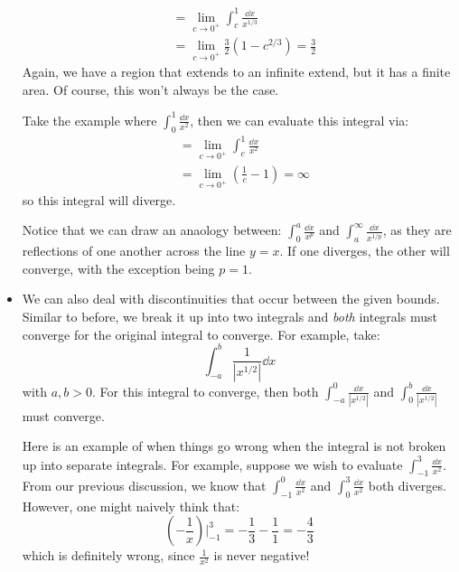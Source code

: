 \begin{itemize}
\begin{example}
        \begin{align}
            &= \lim_{c\to 0^+} \int_c^1 \frac{\dd{x}}{x^{1/3}} \\ 
            &= \lim_{c\to 0^+} \frac{3}{2}\left(1-c^{2/3}\right) = \frac{3}{2}
        \end{align}
        Again, we have a region that extends to an infinite extend, but it has a finite area. Of course, this won't always be the case.
    \end{example}
    \begin{example}
        Take the example where $\int_0^1 \frac{\dd{x}}{x^2}$, then we can evaluate this integral via:
        \begin{align}
            &= \lim_{c\to 0^+} \int_c^1 \frac{\dd{x}}{x^2} \\ 
            &= \lim_{c \to 0^+} \left(\frac{1}{c}-1\right) = \infty
        \end{align}
        so this integral will diverge.
    \end{example}
    \begin{idea}
        Notice that we can draw an anaology between: $\int_0^a \frac{\dd{x}}{x^p}$ and $\int_a^\infty \frac{\dd{x}}{x^{1/p}}$, as they are reflections of one another across the line $y=x$. If one diverges, the other will converge, with the exception being $p=1$.
    \end{idea}
    \item We can also deal with discontinuities that occur between the given bounds. Similar to before, we break it up into two integrals and \textit{both} integrals must converge for the original integral to converge. For example, take:
    \begin{equation}
       \int_{-a}^b \frac{1}{|x^{1/2}|} \dd{x}
    \end{equation}
    with $a,b>0$. For this integral to converge, then both $\int_{-a}^0 \frac{\dd{x}}{|x^{1/2}|}$ and $\int_{0}^b \frac{\dd{x}}{|x^{1/2}|}$ must converge.
    \begin{warning}
        Here is an example of when things go wrong when the integral is not broken up into separate integrals. For example, suppose we wish to evaluate $\int_{-1}^3 \frac{\dd{x}}{x^2}$. From our previous discussion, we know that $\int_{-1}^0 \frac{\dd{x}}{x^2}$ and $\int_{0}^3 \frac{\dd{x}}{x^2}$ both diverges. However, one might naively think that:
        \begin{equation}
            \left(-\frac{1}{x}\right)\Bigg|^3_{-1} = -\frac{1}{3}-\frac{1}{1} = - \frac{4}{3}
        \end{equation}
        which is definitely wrong, since $\frac{1}{x^2}$ is never negative!
    \end{warning}
\end{itemize}